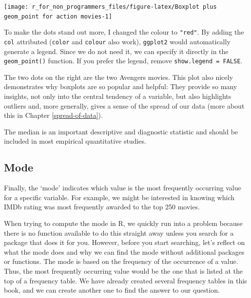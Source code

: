 \documentclass[
]{book}
\begin{document}
\begin{center}\texttt{[image: r\_for\_non\_programmers\_files/figure-latex/Boxplot plus geom\_point for action movies-1]} \end{center}

To make the dots stand out more, I changed the colour to \texttt{"red"}. By adding the \texttt{col} attributed (\texttt{color} and \texttt{colour} also work), \texttt{ggplot2} would automatically generate a legend. Since we do not need it, we can specify it directly in the \texttt{geom\_point()} function. If you prefer the legend, remove \texttt{show.legend\ =\ FALSE}.

The two dots on the right are the two Avengers movies. This plot also nicely demonstrates why boxplots are so popular and helpful: They provide so many insights, not only into the central tendency of a variable, but also highlights outliers and, more generally, gives a sense of the spread of our data (more about this in Chapter \ref{spread-of-data}).

The median is an important descriptive and diagnostic statistic and should be included in most empirical quantitative studies.

\hypertarget{mode}{%
\subsection{Mode}\label{mode}}

Finally, the `mode' indicates which value is the most frequently occurring value for a specific variable. For example, we might be interested in knowing which IMDb rating was most frequently awarded to the top 250 movies.

When trying to compute the mode in R, we quickly run into a problem because there is no function available to do this straight away unless you search for a package that does it for you. However, before you start searching, let's reflect on what the mode does and why we can find the mode without additional packages or functions. The mode is based on the frequency of the occurrence of a value. Thus, the most frequently occurring value would be the one that is listed at the top of a frequency table. We have already created several frequency tables in this book, and we can create another one to find the answer to our question.
\end{document}
